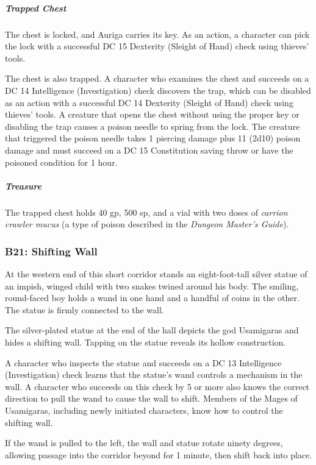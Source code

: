 \documentclass[10pt,a4paper,twoside,bg=print,twocolumn,openany,nodeprecatedcode]{dndbook}
\begin{document}
\subparagraph{Trapped Chest}
The chest is locked, and Auriga carries its key. As an action, a character can pick the lock with a successful DC 15 Dexterity (Sleight of Hand) check using thieves' tools.

The chest is also trapped. A character who examines the chest and succeeds on a DC 14 Intelligence (Investigation) check discovers the trap, which can be disabled as an action with a successful DC 14 Dexterity (Sleight of Hand) check using thieves' tools. A creature that opens the chest without using the proper key or disabling the trap causes a poison needle to spring from the lock. The creature that triggered the poison needle takes 1 piercing damage plus 11 (2d10) poison damage and must succeed on a DC 15 Constitution saving throw or have the poisoned condition for 1 hour.

\subparagraph{Treasure}
The trapped chest holds 40 gp, 500 sp, and a vial with two doses of \textit{carrion crawler mucus} (a type of poison described in the \textit{Dungeon Master's Guide}).

\subsubsection{B21: Shifting Wall}
\begin{DndReadAloud}{}
At the western end of this short corridor stands an eight-foot-tall silver statue of an impish, winged child with two snakes twined around his body. The smiling, round-faced boy holds a wand in one hand and a handful of coins in the other. The statue is firmly connected to the wall.

\end{DndReadAloud}

The silver-plated statue at the end of the hall depicts the god Usamigaras and hides a shifting wall. Tapping on the statue reveals its hollow construction.

A character who inspects the statue and succeeds on a DC 13 Intelligence (Investigation) check learns that the statue's wand controls a mechanism in the wall. A character who succeeds on this check by 5 or more also knows the correct direction to pull the wand to cause the wall to shift. Members of the Mages of Usamigaras, including newly initiated characters, know how to control the shifting wall.

If the wand is pulled to the left, the wall and statue rotate ninety degrees, allowing passage into the corridor beyond for 1 minute, then shift back into place.
\end{document}
